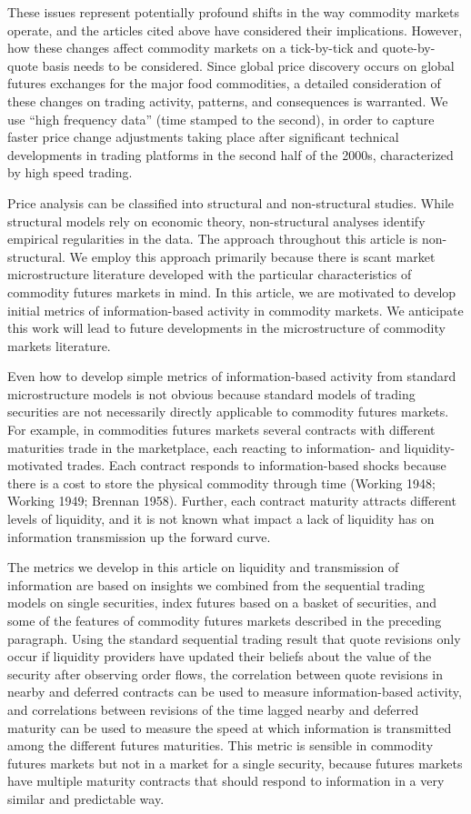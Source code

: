 \documentclass[]{elsarticle} %
\begin{document}
These issues represent potentially profound shifts in the way commodity
markets operate, and the articles cited above have considered their
implications. However, how these changes affect commodity markets on a
tick-by-tick and quote-by-quote basis needs to be considered. Since
global price discovery occurs on global futures exchanges for the major
food commodities, a detailed consideration of these changes on trading
activity, patterns, and consequences is warranted. We use ``high
frequency data'' (time stamped to the second), in order to capture
faster price change adjustments taking place after significant technical
developments in trading platforms in the second half of the 2000s,
characterized by high speed trading.

Price analysis can be classified into structural and non-structural
studies. While structural models rely on economic theory, non-structural
analyses identify empirical regularities in the data. The approach
throughout this article is non-structural. We employ this approach
primarily because there is scant market microstructure literature
developed with the particular characteristics of commodity futures
markets in mind. In this article, we are motivated to develop initial
metrics of information-based activity in commodity markets. We
anticipate this work will lead to future developments in the
microstructure of commodity markets literature.

Even how to develop simple metrics of information-based activity from
standard microstructure models is not obvious because standard models of
trading securities are not necessarily directly applicable to commodity
futures markets. For example, in commodities futures markets several
contracts with different maturities trade in the marketplace, each
reacting to information- and liquidity-motivated trades. Each contract
responds to information-based shocks because there is a cost to store
the physical commodity through time (Working 1948; Working 1949; Brennan
1958). Further, each contract maturity attracts different levels of
liquidity, and it is not known what impact a lack of liquidity has on
information transmission up the forward curve.

The metrics we develop in this article on liquidity and transmission of
information are based on insights we combined from the sequential
trading models on single securities, index futures based on a basket of
securities, and some of the features of commodity futures markets
described in the preceding paragraph. Using the standard sequential
trading result that quote revisions only occur if liquidity providers
have updated their beliefs about the value of the security after
observing order flows, the correlation between quote revisions in nearby
and deferred contracts can be used to measure information-based
activity, and correlations between revisions of the time lagged nearby
and deferred maturity can be used to measure the speed at which
information is transmitted among the different futures maturities. This
metric is sensible in commodity futures markets but not in a market for
a single security, because futures markets have multiple maturity
contracts that should respond to information in a very similar and
predictable way.
\end{document}
